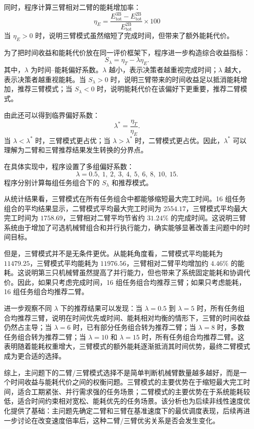 同时，程序计算三臂相对二臂的能耗增加率：
\[
	\eta_E
	=
	\frac{E_{\mathrm{tot}}^{\mathrm{3B}}-E_{\mathrm{tot}}^{\mathrm{2B}}}
	{E_{\mathrm{tot}}^{\mathrm{2B}}}
	\times 100%
\]
当 $\eta_E>0$ 时，说明三臂模式虽然缩短了完成时间，但带来了额外能耗代价。

为了把时间收益和能耗代价放在同一评价框架下，程序进一步构造综合收益指标：
\[
	S_{\lambda}
	=
	\eta_T-\lambda \eta_E .
\]
其中，$\lambda$ 为时间--能耗偏好系数。$\lambda$ 越小，表示决策者越重视完成时间；$\lambda$ 越大，表示决策者越重视能耗。当 $S_{\lambda}>0$ 时，说明三臂带来的时间收益足以抵消能耗增加，推荐三臂模式；当 $S_{\lambda}<0$ 时，说明能耗代价在该偏好下更重要，推荐二臂模式。

由此还可以得到临界偏好系数：
\[
	\lambda^{*}
	=
	\frac{\eta_T}{\eta_E}.
\]
当 $\lambda<\lambda^{*}$ 时，三臂模式更占优；当 $\lambda>\lambda^{*}$ 时，二臂模式更占优。因此，$\lambda^{*}$ 可以理解为二臂和三臂推荐结果发生转换的分界点。

在具体实现中，程序设置了多组偏好系数：
\[
	\lambda
	=
	0.5,\ 1,\ 2,\ 3,\ 4,\ 5,\ 6,\ 8,\ 10,\ 15 .
\]
程序分别计算每组任务组合下的 $S_{\lambda}$ 和推荐模式。

从统计结果看，三臂模式在所有任务组合中都能够缩短最大完工时间。16 组任务组合的平均结果显示，二臂模式平均最大完工时间为 $2554.17$，三臂模式平均最大完工时间为 $1758.69$，三臂相对二臂平均节省约 $31.24\%$ 的完成时间。这说明三臂系统由于增加了可选机械臂组合和并行执行能力，确实能够显著改善主问题中的时间目标。

但是，三臂模式并不是无条件更优。从能耗角度看，二臂模式平均能耗为 $11479.25$，三臂模式平均能耗为 $11976.56$，三臂相对二臂平均增加约 $4.46\%$ 的能耗。这说明第三只机械臂虽然提高了并行能力，但也带来了系统固定能耗和协调代价。因此，如果只考虑完成时间，16 组任务组合均推荐三臂；如果只考虑能耗，16 组任务组合均推荐二臂。

进一步观察不同 $\lambda$ 下的推荐结果可以发现：当 $\lambda=0.5$ 到 $\lambda=5$ 时，所有任务组合均推荐三臂，说明在时间优先或时间、能耗相对均衡的情形下，三臂的时间收益仍然占主导；当 $\lambda=6$ 时，已有部分任务组合转为推荐二臂；当 $\lambda=8$ 时，多数任务组合转为推荐二臂；当 $\lambda=10$ 和 $\lambda=15$ 时，所有任务组合均推荐二臂。这表明随着能耗权重增大，三臂模式的额外能耗逐渐抵消其时间优势，最终二臂模式成为更合适的选择。

综上，主问题下的二臂/三臂模式选择不是简单判断机械臂数量越多越好，而是一个时间收益与能耗代价之间的权衡问题。三臂模式的主要优势在于缩短最大完工时间，适合工期紧张、并行需求强的任务场景；二臂模式的主要优势在于系统能耗较低，适合时间约束相对宽松、能耗优先的任务场景。该分析也为后续非线性速度优化提供了基础：主问题先确定二臂和三臂在基准速度下的最优调度表现，后续再进一步讨论在改变速度倍率后，这种二臂/三臂优劣关系是否会发生变化。
